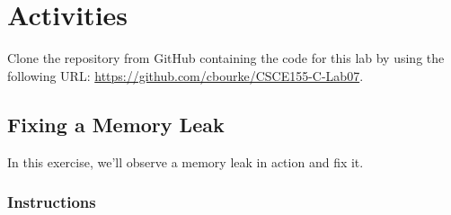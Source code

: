 \documentclass[12pt]{scrartcl}
\begin{document}
\section{Activities}

Clone the repository from GitHub containing the code for this lab by using 
the following URL: \url{https://github.com/cbourke/CSCE155-C-Lab07}.

\subsection{Fixing a Memory Leak}

In this exercise, we'll observe a memory leak in action and fix it.

\subsubsection*{Instructions}
\end{document}
